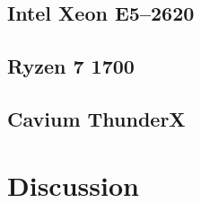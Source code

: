 \documentclass[b5paper]{report}
\begin{document}
\clearpage
\section{Intel\textregistered{} Xeon\textregistered{} E5--2620}
\begin{figure}[ht]
\end{figure}

\clearpage
\section{Ryzen 7 1700}
\begin{figure}[ht]
\end{figure}

\clearpage
\section{Cavium ThunderX}
\begin{figure}[ht]
\end{figure}


\chapter{Discussion}
\end{document}
